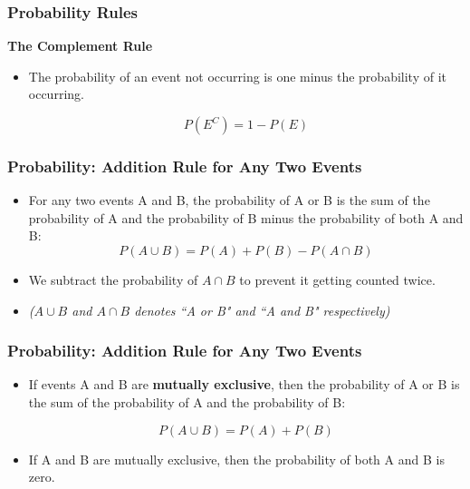 \documentclass[IntroMain.tex]{subfiles}
\begin{document}
	\begin{frame}
		\frametitle{Probability Rules}
		\textbf{The Complement Rule}
		\begin{itemize}
			\item 
			The probability of an event not occurring is one minus the probability of it occurring.
			
			\[P(E^{C}) = 1 - P(E)\]
		\end{itemize}
	\end{frame}
	\begin{frame}
		\frametitle{Probability: Addition Rule for Any Two Events}
		\Large
		\vspace{-0.3cm}
		\begin{itemize}
			\item For any two events A and B, the probability of A or B is the sum of the probability of A and the probability of B minus the probability of both A and B:
			\[P(A \cup B) = P(A) + P(B) - P(A \cap B)\]
			\vspace{-0.2cm}
			\item We subtract the probability of $A \cap B$ to prevent it getting counted twice.
			\large
			\item \textit{($A \cup B$ and $A \cap B$ denotes  ``A or B" and ``A and B" respectively) }
			
		\end{itemize}
	\end{frame}
	\begin{frame}
		\frametitle{Probability: Addition Rule for Any Two Events}
		\Large
		\begin{itemize}
			\item If events A and B are \textbf{mutually exclusive}, then the probability of A or B is the sum of the probability of A and the probability of B:
			
			\[P(A \cup B) = P(A) + P(B)\]
			
			\item If A and B are mutually exclusive, then the probability of both A and B is zero.
		\end{itemize}
	\end{frame}
\end{document}
